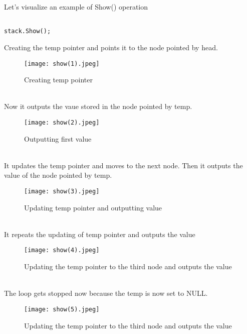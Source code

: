 \documentclass[11pt,fleqn]{book} %
\begin{document}
Let's visualize an example of Show() operation
\begin{example}
\begin{lstlisting}
	
stack.Show();
\end{lstlisting}
Creating the temp pointer and points it to the node pointed by head.
\begin{figure}[H]
	\centering
	\texttt{[image: show(1).jpeg]}
	\caption{Creating temp pointer}
\end{figure} ~\\
Now it outputs the vaue stored in the node pointed by temp.
\begin{figure}[H]
	\centering
	\texttt{[image: show(2).jpeg]}
	\caption{Outputting first value}
\end{figure} ~\\
It updates the temp pointer and moves to the next node. Then it outputs the value of the node pointed by temp.
\begin{figure}[H]
	\centering
	\texttt{[image: show(3).jpeg]}
	\caption{Updating temp pointer and outputting value}
\end{figure} ~\\
It repeats the updating of temp pointer and outputs the value
\begin{figure}[H]
	\centering
	\texttt{[image: show(4).jpeg]}
	\caption{Updating the temp pointer to the third node and outputs the value}
\end{figure} ~\\
The loop gets stopped now because the temp is now set to NULL.
\begin{figure}[H]
	\centering
	\texttt{[image: show(5).jpeg]}
	\caption{Updating the temp pointer to the third node and outputs the value}
\end{figure}
\end{example}
\newpage
\end{document}
